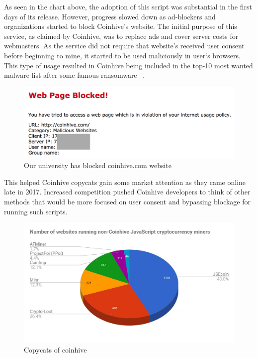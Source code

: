 As seen in the chart above, the adoption of this script was substantial in the first days of its release. However, progress slowed down as ad-blockers and organizations started to block Coinhive's website. The initial purpose of this service, as claimed by Coinhive, was to replace ads and cover server costs for webmasters. As the service did not require that website's received user consent before beginning to mine, it started to be used maliciously in user`s browsers. This type of usage resulted in Coinhive being included in the top-10 most wanted malware list after some famous ransomware ~\cite{checkpoint}. 

\begin{figure}[t]
\centering
\includegraphics[width=\linewidth]{figures/coinhive_blocked.png}
\caption{Our university has blocked coinhive.com website}
\end{figure}


This helped Coinhive copycats gain some market attention as they came online late in 2017. Increased competition pushed Coinhive developers to think of other methods that would be more focused on user consent and bypassing blockage for running such scripts.

\begin{figure}[t]
\centering
\includegraphics[width=\linewidth]{figures/non-coinhive-miners.png}
	\caption{Copycats of coinhive}
\end{figure}


